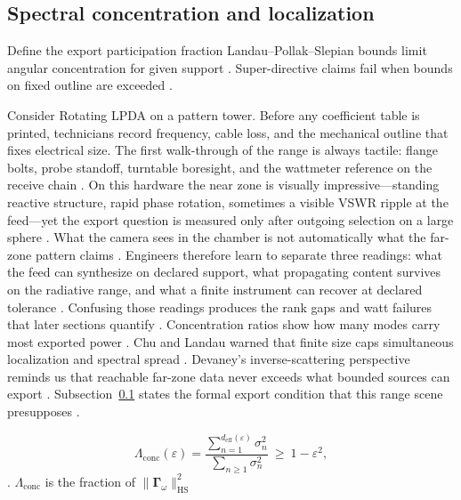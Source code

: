 \subsection{Spectral concentration and localization}
\label{sec:ch483}
Define the export participation fraction
Landau--Pollak--Slepian bounds limit angular concentration for given support \cite{landau1962}. Super-directive claims fail when bounds on fixed outline are exceeded \cite{chu1948}.
\medskip
\begin{physicalvignette}
Consider Rotating LPDA on a pattern tower. Before any coefficient table is printed, technicians record frequency, cable loss, and the mechanical outline that fixes electrical size. The first walk-through of the range is always tactile: flange bolts, probe standoff, turntable boresight, and the wattmeter reference on the receive chain \cite{hansen1988}.
On this hardware the near zone is visually impressive---standing reactive structure, rapid phase rotation, sometimes a visible VSWR ripple at the feed---yet the export question is measured only after outgoing selection on a large sphere \cite{harrington2001}. What the camera sees in the chamber is not automatically what the far-zone pattern claims \cite{stratton1941}.
Engineers therefore learn to separate three readings: what the feed can synthesize on declared support, what propagating content survives on the radiative range, and what a finite instrument can recover at declared tolerance \cite{devaney2004}. Confusing those readings produces the rank gaps and watt failures that later sections quantify \cite{pal2026}.
Concentration ratios show how many modes carry most exported power . 
Chu and Landau warned that finite size caps simultaneous localization and spectral spread \cite{chu1948}. Devaney's inverse-scattering perspective reminds us that reachable far-zone data never exceeds what bounded sources can export \cite{devaney2004}.
Subsection~\ref{sec:ch483} states the formal export condition that this range scene presupposes \cite{stratton1941}.
\end{physicalvignette}
\begin{equation}
\label{eq:ch4.spectral-concentration-ratio}
\Lambda_{\mathrm{conc}}(\varepsilon)=\frac{\sum_{n=1}^{d_{\mathrm{eff}}(\varepsilon)}\sigma_{n}^{2}}{\sum_{n\ge1}\sigma_{n}^{2}}\ \ge\ 1-\varepsilon^{2},
\end{equation}
\cite{harrington2001}. \(\Lambda_{\mathrm{conc}}\) is the fraction of \(\|\boldsymbol{\Gamma}_\omega\|_{\mathrm{HS}}^{2}\)
